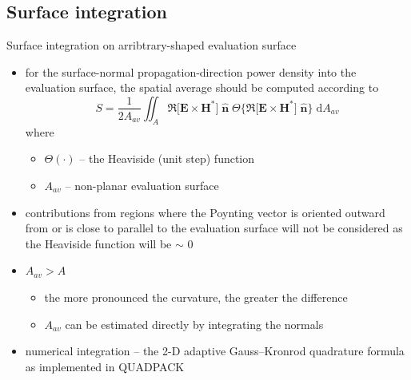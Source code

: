 \documentclass[xcolor=dvipsnames,10pt]{beamer}
\begin{document}
\subsection{Surface integration}
\begin{frame}{Surface integration on arribtrary-shaped evaluation surface}
    \begin{itemize}
        \item for the surface-normal propagation-direction power density into the evaluation surface, the spatial average should be computed according to
        \begin{equation*}
            S = \frac{1}{2A_{av}} \iint_A \Re \big[ \boldsymbol{E} \times \boldsymbol{H}^* \big] \; \boldsymbol{\hat n} \; \Theta \Big\{ \Re \big[ \boldsymbol{E} \times \boldsymbol{H}^* \big] \; \boldsymbol{\hat n} \Big\} \; \mathrm{d}A_{av}
        \end{equation*}
        where
        \begin{itemize}
            \item $\Theta(\cdot)$ -- the Heaviside (unit step) function
            \item $A_{av}$ -- non-planar evaluation surface
        \end{itemize}
        \item contributions from regions where the Poynting vector is oriented outward from or is close to parallel to the evaluation surface will not be considered as the Heaviside function will be $\sim$ 0
        \item $A_{av} > A$
        \begin{itemize}
            \item the more pronounced the curvature, the greater the difference
            \item $A_{av}$ can be estimated directly by integrating the normals
        \end{itemize}
        \item numerical integration -- the 2-D adaptive Gauss–Kronrod quadrature formula as implemented in QUADPACK
    \end{itemize}
\end{frame}
\end{document}
